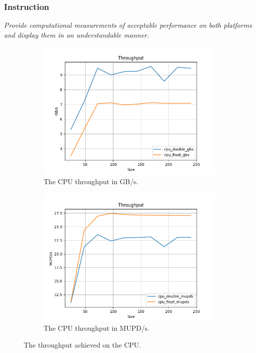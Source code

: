 \documentclass[10pt]{article}
\begin{document}
\subsubsection{Instruction}
\textit{Provide computational measurements of acceptable performance on both platforms and display them in an understandable manner.}
\begin{figure}[!ht]
        \centering
    \begin{subfigure}[b]{0.49\textwidth}
        \centering
        \includegraphics[width=\linewidth]{cpu_gbs.png}
        \caption{The CPU throughput in GB/s.}
        \label{fig:cpu_gbs}
    \end{subfigure}\hfill
    \begin{subfigure}[b]{0.49\textwidth}
        \centering
        \includegraphics[width=\linewidth]{cpu_mupds.png}
        \caption{The CPU throughput in MUPD/s.}
        \label{fig:cpu_mupds}
    \end{subfigure}\hfill
    \caption{The throughput achieved on the CPU.}
    \label{fig:cpu}
\end{figure}
\end{document}
